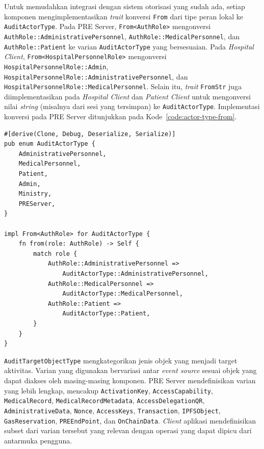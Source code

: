 Untuk memudahkan integrasi dengan sistem otorisasi yang sudah ada, setiap
komponen mengimplementasikan \textit{trait} konversi \texttt{From} dari tipe
peran lokal ke \texttt{AuditActorType}. Pada PRE Server,
\texttt{From<AuthRole>} mengonversi \texttt{AuthRole::AdministrativePersonnel},
\texttt{AuthRole::MedicalPersonnel}, dan \texttt{AuthRole::Patient} ke varian
\texttt{AuditActorType} yang bersesuaian. Pada \textit{Hospital Client},
\texttt{From<HospitalPersonnelRole>} mengonversi \texttt{HospitalPersonnelRole::Admin},
\texttt{HospitalPersonnelRole::AdministrativePersonnel}, dan
\texttt{HospitalPersonnelRole::MedicalPersonnel}. Selain itu, \textit{trait}
\texttt{FromStr} juga diimplementasikan pada \textit{Hospital Client} dan
\textit{Patient Client} untuk mengonversi nilai \textit{string} (misalnya
dari sesi yang tersimpan) ke \texttt{AuditActorType}. Implementasi konversi
pada PRE Server ditunjukkan pada Kode~\ref{code:actor-type-from}.

\begin{listing}[ht]
\caption{Implementasi \texttt{AuditActorType} dan konversi \texttt{From<AuthRole>} pada PRE Server}
\label{code:actor-type-from}
\begin{verbatim}
#[derive(Clone, Debug, Deserialize, Serialize)]
pub enum AuditActorType {
    AdministrativePersonnel,
    MedicalPersonnel,
    Patient,
    Admin,
    Ministry,
    PREServer,
}

impl From<AuthRole> for AuditActorType {
    fn from(role: AuthRole) -> Self {
        match role {
            AuthRole::AdministrativePersonnel =>
                AuditActorType::AdministrativePersonnel,
            AuthRole::MedicalPersonnel =>
                AuditActorType::MedicalPersonnel,
            AuthRole::Patient =>
                AuditActorType::Patient,
        }
    }
}
\end{verbatim}
\end{listing}

\texttt{AuditTargetObjectType} mengkategorikan jenis objek yang menjadi target
aktivitas. Varian yang digunakan bervariasi antar \textit{event source} sesuai
objek yang dapat diakses oleh masing-masing komponen. PRE Server mendefinisikan
varian yang lebih lengkap, mencakup \texttt{ActivationKey}, \texttt{AccessCapability},
\texttt{MedicalRecord}, \texttt{MedicalRecordMetadata}, \texttt{AccessDelegationQR},
\texttt{AdministrativeData}, \texttt{Nonce}, \texttt{AccessKeys},
\texttt{Transaction}, \texttt{IPFSObject}, \texttt{GasReservation},
\texttt{PREEndPoint}, dan \texttt{OnChainData}. \textit{Client} aplikasi
mendefinisikan subset dari varian tersebut yang relevan dengan operasi yang
dapat dipicu dari antarmuka pengguna.

